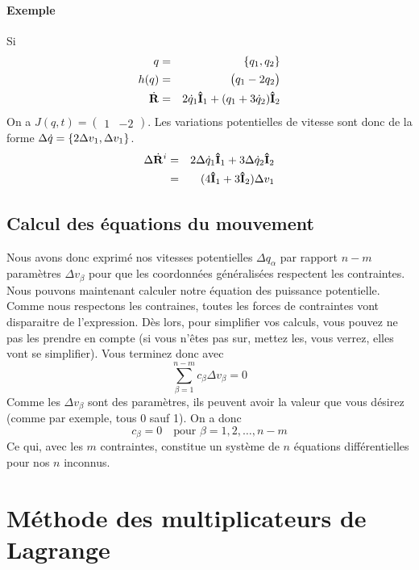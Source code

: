\paragraph{Exemple}
Si
\begin{eqnarray*}
	q &=& \{q_1, q_2\}\\
	h(q) &=& \begin{pmatrix}q_1 - 2q_2\end{pmatrix}\\
	\dot{\bf R} &=& 2\dot{q}_1 {\bf\hat{I}}_1 + (q_1 + 3\dot{q}_2) {\bf\hat{I}}_2
\end{eqnarray*}
On a $J(q, t) = \begin{pmatrix}1 & -2\end{pmatrix}$.
Les variations potentielles de vitesse sont donc de la forme $\Delta \dot{q} = \{2\Delta v_1, \Delta v_1\}$.
\begin{eqnarray*}
	\Delta \dot{\bf R}^i &=& 2 \Delta \dot{q}_1 {\bf\hat{I}}_1 + 3 \Delta \dot{q}_2 {\bf\hat{I}}_2\\
	&=& (4{\bf\hat{I}}_1 + 3{\bf\hat{I}}_2) \Delta v_1
\end{eqnarray*}


\subsection{Calcul des équations du mouvement}
Nous avons donc exprimé nos vitesses potentielles $\Delta q_\alpha$ par rapport $n - m$ paramètres $\Delta v_\beta$ pour que les coordonnées généralisées respectent les contraintes.
Nous pouvons maintenant calculer notre équation des puissance potentielle.
Comme nous respectons les contraines, toutes les forces de contraintes vont disparaitre de l'expression.
Dès lors, pour simplifier vos calculs, vous pouvez ne pas les prendre en compte (si vous n'êtes pas sur, mettez les, vous verrez, elles vont se simplifier).
Vous terminez donc avec
\[ \sum_{\beta = 1}^{n - m} c_\beta \Delta v_\beta = 0 \]
Comme les $\Delta v_\beta$ sont des paramètres, ils peuvent avoir la valeur que vous désirez
(comme par exemple, tous 0 sauf 1).
On a donc
\[ c_\beta = 0 \quad \text{pour }\beta = 1, 2, \ldots, n-m \]
Ce qui, avec les $m$ contraintes, constitue un système de $n$ équations différentielles pour nos $n$ inconnus.

\section{Méthode des multiplicateurs de Lagrange}

